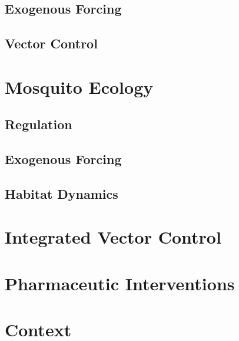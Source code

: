 \documentclass[
]{book}
\begin{document}
\hypertarget{exogenous-forcing}{%
\subsection{Exogenous Forcing}\label{exogenous-forcing}}

\hypertarget{vector-control}{%
\subsection{Vector Control}\label{vector-control}}

\hypertarget{mosquito-ecology-1}{%
\section{Mosquito Ecology}\label{mosquito-ecology-1}}

\hypertarget{regulation}{%
\subsection{Regulation}\label{regulation}}

\hypertarget{exogenous-forcing-1}{%
\subsection{Exogenous Forcing}\label{exogenous-forcing-1}}

\hypertarget{habitat-dynamics}{%
\subsection{Habitat Dynamics}\label{habitat-dynamics}}

\hypertarget{integrated-vector-control}{%
\section{Integrated Vector Control}\label{integrated-vector-control}}

\hypertarget{pharmaceutic-interventions}{%
\section{Pharmaceutic Interventions}\label{pharmaceutic-interventions}}

\hypertarget{context}{%
\section{Context}\label{context}}
\end{document}
